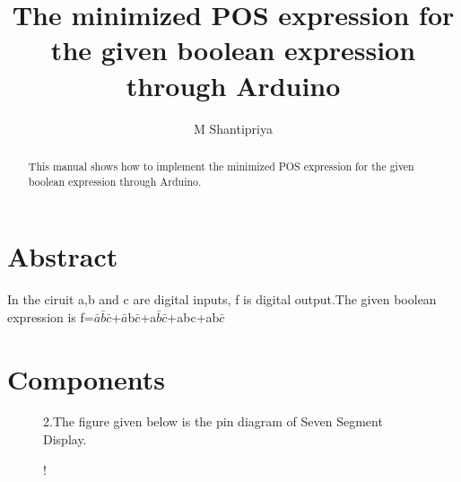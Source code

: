 \documentclass[journal,12pt,twocolumn]{IEEEtran}
\begin{document}
%

\theoremstyle{definition}
\newtheorem{theorem}{Theorem}[section]
\newtheorem{problem}{Problem}
\newtheorem{proposition}{Proposition}[section]
\newtheorem{lemma}{Lemma}[section]
\newtheorem{corollary}[theorem]{Corollary}
\newtheorem{example}{Example}[section]
\newtheorem{definition}{Definition}[section]
\newcommand{\BEQA}{\begin{eqnarray}}
\newcommand{\EEQA}{\end{eqnarray}}
\newcommand{\define}{\stackrel{\triangle}{=}}
\vspace{2cm}
\title{ 
The minimized POS expression for the given boolean expression through Arduino
}

\author{M Shantipriya}


\maketitle
\tableofcontents
%
\section{\textbf{Abstract}}

\begin{abstract}
This manual shows how to implement the minimized POS expression for the given boolean expression through Arduino.
\end{abstract}

In the ciruit a,b and c are digital inputs, f is digital output.The given boolean expression is f=$\bar{a}$$\bar{b}$$\bar{c}$+$\bar{a}$b$\bar{c}$+a$\bar{b}$$\bar{c}$+abc+ab$\bar{c}$

\section{\textbf{Components}}

\begin{table}[!h]
\centering
\caption{}
\label{table:7447_disp}
\end{table}

\begin{figure}[!h]
2.The figure given below is the pin diagram of Seven Segment Display.\\
\begin{center}
\resizebox {0.4\columnwidth} {!} {

}
\end{center}

\caption{}
\label{fig:sevenseg}
\end{figure}
\end{document}
